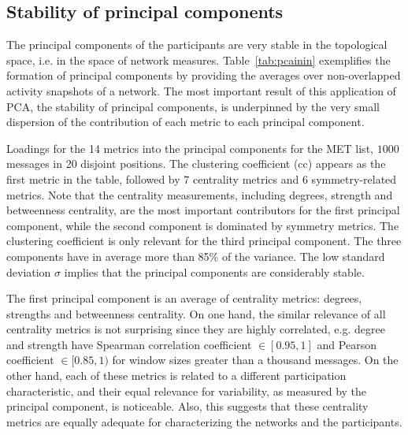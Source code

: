 \subsection{Stability of principal components}\label{prevalence}

The principal components of the participants are very stable in the topological space,
i.e. in the space of network measures.
Table~\ref{tab:pcainin} exemplifies the formation of principal components by providing the averages over non-overlapped activity snapshots of a network. The most important result of this application of PCA, the stability of principal components, is underpinned by the very small dispersion of the contribution of each metric to each principal component.

\begin{table}[!h]
\caption{Loadings for the 14 metrics into the principal components for the MET list, $1000$ messages in 20 disjoint positions. The clustering coefficient (cc) appears as the first metric in the table, followed by 7 centrality metrics and 6 symmetry-related metrics. Note that the centrality measurements, including degrees, strength and betweenness centrality, are the most important contributors for the first principal component, while the second component is dominated by symmetry metrics. The clustering coefficient is only relevant for the third principal component. The three components have in average more than 85\% of the variance.
The low standard deviation $\sigma$ implies that the principal components are considerably stable.}
\footnotesize

\label{tab:pcainin}
\end{table}

The first principal component is an average of centrality metrics:
degrees, strengths and betweenness centrality.
On one hand, the similar relevance of all centrality metrics is not surprising since they are highly correlated,
e.g. degree and strength have Spearman correlation coefficient $\in [0.95,1]$ 
and Pearson coefficient $\in [0.85,1)$ for window sizes greater than a thousand messages.
On the other hand, each of these metrics is related to a different participation characteristic,
and their equal relevance for variability,
as measured by the principal component, is noticeable.
Also, this suggests that these centrality metrics 
are equally adequate for characterizing the networks
and the participants.


